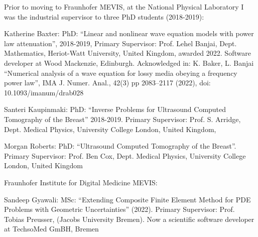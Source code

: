 \documentclass[checked=true, walterbenjamin=false]{dfg-cv-en}
\begin{document}
\secSupervision 
\noindent%
Prior to moving to Fraunhofer MEVIS, at the National Physical Laboratory I was the industrial supervisor to three PhD students (2018-2019):
\begin{compactItemize}
\item Katherine Baxter: PhD: \enquote{Linear and nonlinear wave equation models with power law attenuation}, 2018-2019, Primary Supervisor: Prof. Lehel Banjai, Dept. Mathematics, Heriot-Watt University, United Kingdom, awarded 2022. Software developer at Wood Mackenzie, Edinburgh.  Acknowledged in: K. Baker, L. Banjai \enquote{Numerical analysis of a wave equation for lossy media obeying a frequency power law}, IMA J. Numer. Anal., 42(3) pp 2083–2117 (2022), doi: 10.1093/imanum/drab028
\item Santeri Kaupinmaki: PhD: \enquote{Inverse Problems for Ultrasound Computed Tomography of the Breast} 2018-2019. Primary Supervisor: Prof. S. Arridge, Dept. Medical Physics, University College London, United Kingdom, 
\item Morgan Roberts: PhD: \enquote{Ultrasound Computed Tomography of the Breast}. Primary Supervisor: Prof. Ben Cox, Dept. Medical Physics, University College London, United Kingdom
\end{compactItemize}
\vspace{\baselineskip}\noindent
Fraunhofer Institute for Digital Medicine MEVIS:
\begin{compactItemize}
\item Sandeep Gyawali: MSc: \enquote{Extending Composite Finite Element Method for PDE Problems with Geometric Uncertainties} (2022). Primary Supervisor: Prof. Tobias Preusser, (Jacobs University Bremen). Now a scientific software developer at TechsoMed GmBH, Bremen
\end{compactItemize}
%
\secResults
%
\secCategoryA 
%
\end{document}
